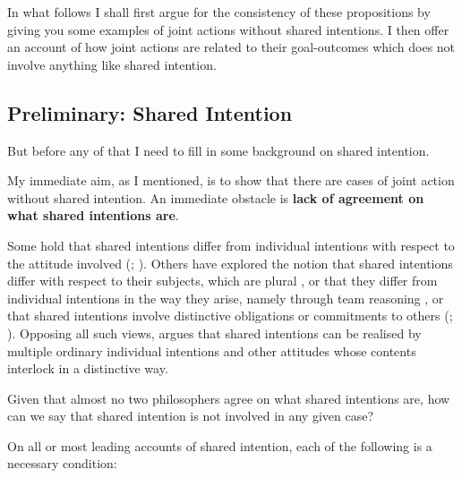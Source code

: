\documentclass[14pt,a4paper]{extarticle}
\begin{document}
In what follows I shall first argue for the consistency of these propositions by giving you some examples of joint actions without shared intentions.  I then offer an account of how joint actions are related to their goal-outcomes which does not involve anything like shared intention.  


\subsection{Preliminary: Shared Intention}

But before any of that I need to fill in some background on shared intention.

My immediate aim, as I mentioned, is to show that there are cases of joint action without shared intention.  An immediate obstacle is \textbf{lack of agreement on what shared intentions are}.  

Some hold that shared intentions differ from individual intentions with respect to the attitude involved (\citealp{Kutz:2000si}; \citealp{Searle:1990em}). 
Others have explored the notion that shared intentions differ with respect to their subjects, which are plural \citep{Gilbert:1992rs}, 
or that they differ from individual intentions in the way they arise, namely through team reasoning \citep{Gold:2007zd}, 
or that shared intentions involve distinctive obligations or commitments to others (\citealp{Gilbert:1992rs}; \citealp{Roth:2004ki}).
Opposing all such views, \citet{Bratman:1992mi,Bratman:2009lv} argues that shared intentions can be realised by multiple ordinary individual intentions and other attitudes whose contents interlock in a distinctive way. 

Given that almost no two philosophers agree on what shared intentions are, how can we say that shared intention is not involved in any given case?  

On all or most leading accounts of shared intention, each of the following is a necessary condition:
\end{document}
